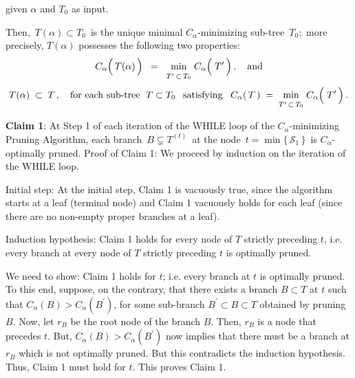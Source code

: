 \begin{proposition}
\begin{itemize}
	given $\alpha$ and $T_{0}$ as input.
\end{itemize}
Then, \,$T(\alpha) \subset T_{0}$\, is the unique
{\color{red}minimal $C_{\alpha}$-minimizing} sub-tree \,$T_{0}$;\,
more precisely, $T(\alpha)$ possesses the following two properties:
\begin{equation*}
C_{\alpha}\!\left(\,\overset{{\color{white}.}}{T}(\alpha)\,\right)
\;\; = \;\;
	\underset{T^{\prime} \,\overset{{\color{white}.}}{\subset}\, T_{0}}{\min}\;
	C_{\alpha}\!\left(\;\overset{{\color{white}.}}{T^{\prime}}\,\right),
\quad
\textnormal{and}
\end{equation*}
\begin{equation*}
T(\alpha) \; \subset \; T\,,
\quad
\textnormal{for each sub-tree \;$T \subset T_{0}$\;\, satisfying}\;\;\;
C_{\alpha}(\,T\,)
\; = \;
	\underset{T^{\prime} \,\overset{{\color{white}.}}{\subset}\, T_{0}}{\min}\;
	C_{\alpha}\!\left(\;\overset{{\color{white}.}}{T^{\prime}}\,\right).
\end{equation*}
\end{proposition}
\proof

\vskip 0.5cm
\noindent
\textbf{Claim 1}:\quad
At Step 1 of each iteration of the WHILE loop of the $C_{\alpha}$-minimizing Pruning Algorithm,
each branch \,$B \subsetneq T^{(t)}$\, at the node \,$t = \min\{\,\mathcal{S}_{1}\,\}$\, is $C_{\alpha}$-optimally pruned.
\vskip 0.2cm
\noindent
Proof of Claim 1:\quad
We proceed by induction on the iteration of the WHILE loop.

\vskip 0.2cm
\noindent
Initial step:\;
At the initial step, Claim 1 is vacuously true, since the algorithm starts at a leaf (terminal node)
and Claim 1 vacuously holds for each leaf (since there are no non-empty proper branches at a leaf).

\vskip 0.2cm
\noindent
Induction hypothesis:\;
Claim 1 holds for every node of $T$ strictly preceding $t$,
i.e. every branch at every node of $T$ strictly preceding $t$ is optimally pruned.

\vskip 0.2cm
\noindent
We need to show:\;
Claim 1 holds for $t$;
i.e. every branch at $t$ is optimally pruned.
To this end, suppose, on the contrary, that
there exists a branch $B \subset T$ at $t$
such that
$C_{\alpha}(B) > C_{\alpha}(B^{\prime})$,
for some sub-branch $B^{\prime} \subset B \subset T$
obtained by pruning $B$.
Now, let $r_{B}$ be the root node of the branch $B$.
Then, $r_{B}$ is a node that precedes $t$.
But, $C_{\alpha}(B) > C_{\alpha}(B^{\prime})$
now implies that there must be a branch at
$r_{B}$ which is not optimally pruned.
But this contradicts the induction hypothesis.
Thus, Claim 1 must hold for $t$.
This proves Claim 1.

